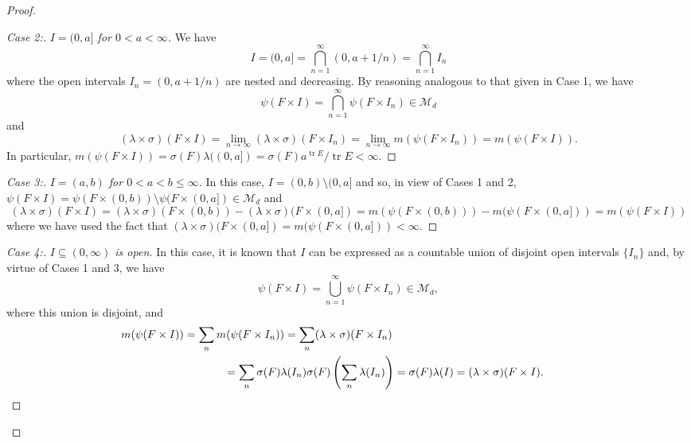 \documentclass[11pt]{article}
\theoremstyle{theorem}
\newcommand*{\myproofname}{Proof}
\newenvironment{subproof}[1][\myproofname]{\begin{proof}[#1]\renewcommand*{\qedsymbol}{$\mathbin{/\mkern-6mu/}$}}{\end{proof}}
\newcommand\tr{\operatorname{tr}}
\begin{document}
\begin{proof}
\begin{subproof}[Case 2:]\textit{$I=(0,a]$ for $0<a<\infty$.} We have
\begin{equation*}
I=(0,a]=\bigcap_{n=1}^\infty (0,a+1/n)=\bigcap_{n=1}^\infty I_n
\end{equation*}
where the open intervals $I_n=(0,a+1/n)$ are nested and decreasing. By reasoning analogous to that given in Case 1, we have
\begin{equation*}
\psi(F\times I)=\bigcap_{n=1}^\infty \psi(F\times I_n)\in \mathcal{M}_d
\end{equation*}
and
\begin{equation*}
(\lambda\times\sigma)(F\times I)=\lim_{n\to\infty}(\lambda\times\sigma)(F\times I_n)=\lim_{n\to\infty}m(\psi(F\times I_n))=m(\psi(F\times I)).
\end{equation*}
In particular, $m(\psi(F\times I))=\sigma(F)\lambda((0,a])=\sigma(F)a^{\tr E}/\tr E<\infty.$
\end{subproof}
\begin{subproof}[Case 3:]\textit{$I=(a,b)$ for $0<a<b\leq \infty$.} In this case, $I=(0,b)\setminus (0,a]$ and so, in view of Cases 1 and 2, $\psi(F\times I)=\psi(F\times (0,b))\setminus \psi(F\times(0,a])\in\mathcal{M}_d$ and
\begin{equation*}
(\lambda\times\sigma)(F\times I)=(\lambda\times\sigma)(F\times (0,b))-(\lambda\times\sigma)(F\times(0,a])=m(\psi(F\times (0,b)))-m(\psi(F\times (0,a]))=m(\psi(F\times I))
\end{equation*}
where we have used the fact that $(\lambda\times\sigma)(F\times(0,a])=m(\psi(F\times (0,a]))<\infty$.
\end{subproof}
\begin{subproof}[Case 4:]\textit{$I\subseteq (0,\infty)$ is open.} In this case, it is known that $I$ can be expressed as a countable union of disjoint open intervals $\{I_n\}$ and, by virtue of Cases 1 and 3, we have
\begin{equation*}
\psi(F\times I)=\bigcup_{n=1}^\infty\psi(F\times I_n)\in\mathcal{M}_d,
\end{equation*}
where this union is disjoint, and
\begin{eqnarray*}
\lefteqn{\hspace{-1cm}m(\psi(F\times I))=\sum_n m(\psi(F\times I_n))=\sum_n (\lambda\times\sigma)(F\times I_n)}\\
&&\hspace{2cm}=\sum_n \sigma(F)\lambda(I_n)\sigma(F)\left(\sum_n \lambda(I_n)\right)=\sigma(F)\lambda(I)=(\lambda\times\sigma)(F\times I).

\end{eqnarray*}
\end{subproof}
\end{proof}
\end{document}
